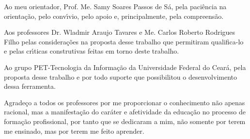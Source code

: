Ao meu orientador, Prof. Me. Samy Soares Passos de S\'{a}, pela paci\^{e}ncia na orienta\c{c}\~{a}o, pelo conv\'{\i}vio, pelo apoio e, principalmente, pela compreens\~{a}o.

Aos professores Dr. Wladmir Araujo Tavares e Me. Carlos Roberto Rodrigues Filho pelas considera\c{c}\~{o}es na proposta desse trabalho que permitiram qualifica-lo e pelas cr\'{\i}ticas construtivas feitas em torno deste trabalho.

Ao grupo PET-Tecnologia da Informa\c{c}\~{a}o da Universidade Federal do Cear\'{a}, pela proposta desse trabalho e por todo suporte que possibilitou o desenvolvimento dessa ferramenta.

Agrade\c{c}o a todos os professores por me proporcionar o conhecimento n\~{a}o apenas racional, mas a manifesta\c{c}\~{a}o do car\'{a}ter e afetividade da educa\c{c}\~{a}o no processo de forma\c{c}\~{a}o profissional, por tanto que se dedicaram a mim, n\~{a}o somente por terem me ensinado, mas por terem me feito aprender. 


